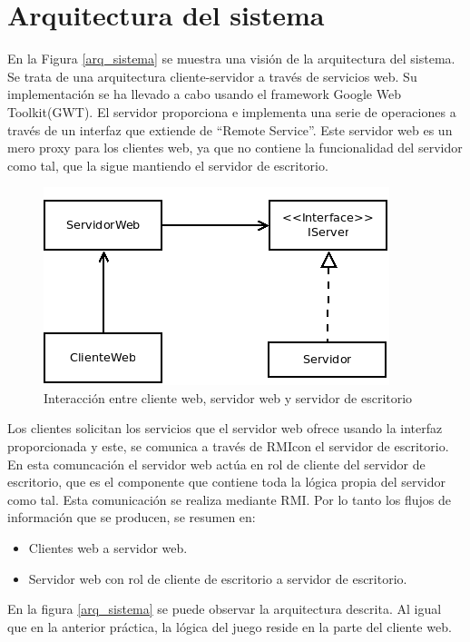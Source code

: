 \section{Arquitectura del sistema}

En la Figura \ref{arq_sistema} se muestra una visión de la arquitectura del sistema. Se
trata de una arquitectura cliente-servidor a través de servicios web. Su implementación se ha llevado a cabo usando el framework Google Web Toolkit(GWT).
El servidor proporciona e implementa una serie de operaciones a través de un interfaz que extiende de ``Remote Service''. Este servidor web es un mero proxy para los clientes web, ya que no contiene la funcionalidad del servidor como tal, que la sigue mantiendo el servidor de escritorio.

 \begin{figure}[h]
 \centering
 \includegraphics[scale=0.65]{img/arq.png}
 \caption{Interacción entre cliente web, servidor web y servidor de escritorio}
 \label{arq}
 \end{figure}

Los clientes solicitan los servicios que el servidor web ofrece usando la interfaz proporcionada y este, se comunica a través de RMIcon el servidor de escritorio. En esta comuncación el servidor web actúa en rol de cliente del servidor de escritorio, que es el componente que contiene toda la lógica propia del servidor como tal. Esta comunicación se realiza mediante RMI.
Por lo tanto los flujos de información que se producen, se resumen en:
\begin{itemize}
 \item Clientes web a servidor web.
\item Servidor web con rol de cliente de escritorio a servidor de escritorio.
\end{itemize}
En la figura \ref{arq_sistema} se puede observar la arquitectura descrita.
Al igual que en la anterior práctica, la lógica del juego reside en la parte del cliente web.

